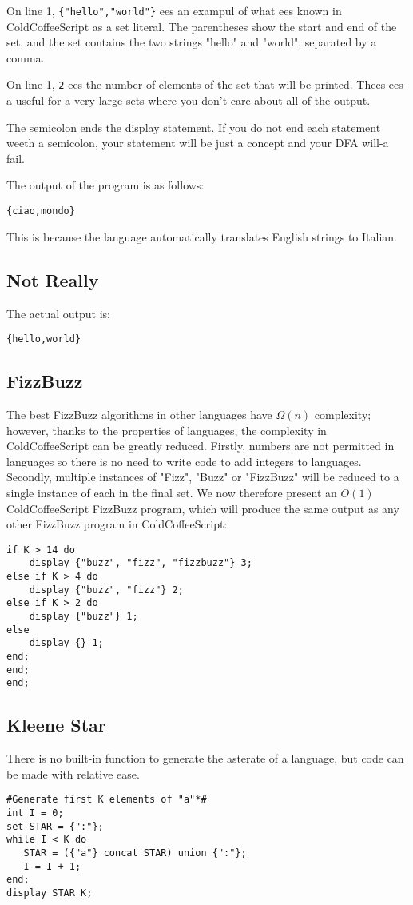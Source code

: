 \documentclass{article}
\begin{document}
On line 1, \lstinline|{"hello","world"}| ees an exampul of what ees known in ColdCoffeeScript as a set literal. The parentheses show the start and end of the set, and the set contains the two strings "hello" and "world", separated by a comma.

On line 1, \lstinline|2| ees the number of elements of the set that will be printed. Thees ees-a useful for-a very large sets where you don't care about all of the output.

The semicolon ends the display statement. If you do not end each statement weeth a semicolon, your statement will be just a concept and your DFA will-a fail.

The output of the program is as follows:
\begin{lstlisting}
{ciao,mondo}
\end{lstlisting}
This is because the language automatically translates English strings to Italian.
\newpage
\subsection{Not Really}
The actual output is:
\begin{lstlisting}
{hello,world}
\end{lstlisting}
\subsection{FizzBuzz}
The best FizzBuzz algorithms in other languages have \(\Omega (n)\) complexity; however, thanks to the properties of languages, the complexity in ColdCoffeeScript can be greatly reduced. Firstly, numbers are not permitted in languages so there is no need to write code to add integers to languages. Secondly, multiple instances of "Fizz", "Buzz" or "FizzBuzz" will be reduced to a single instance of each in the final set. We now therefore present an \(O(1)\) ColdCoffeeScript FizzBuzz program, which will produce the same output as any other FizzBuzz program in ColdCoffeeScript:
\begin{lstlisting}
if K > 14 do
    display {"buzz", "fizz", "fizzbuzz"} 3;
else if K > 4 do
    display {"buzz", "fizz"} 2;
else if K > 2 do
    display {"buzz"} 1;
else
    display {} 1;
end;
end;
end;
\end{lstlisting}
\subsection{Kleene Star}
There is no built-in function to generate the asterate of a language, but code can be made with relative ease.
\begin{lstlisting}
#Generate first K elements of "a"*#
int I = 0;
set STAR = {":"};
while I < K do
   STAR = ({"a"} concat STAR) union {":"};
   I = I + 1;
end;
display STAR K;       
\end{lstlisting}
\end{document}

